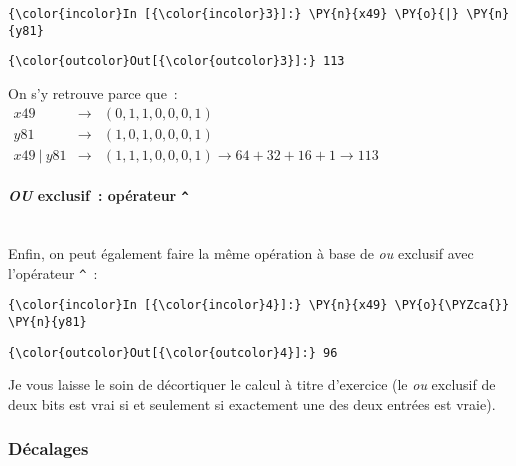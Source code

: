     \begin{Verbatim}[commandchars=\\\{\}]
{\color{incolor}In [{\color{incolor}3}]:} \PY{n}{x49} \PY{o}{|} \PY{n}{y81}
\end{Verbatim}


\begin{Verbatim}[commandchars=\\\{\}]
{\color{outcolor}Out[{\color{outcolor}3}]:} 113
\end{Verbatim}
            
    On s'y retrouve parce que~:\\

\(\begin{array}{rcl} x49 & \rightarrow & (0,1,1,0,0,0,1) \\ y81 & \rightarrow & (1,0,1,0,0,0,1) \\ x49\ |\ y81 & \rightarrow & (1,1,1,0,0,0,1) \rightarrow 64 + 32 + 16 + 1 \rightarrow 113 \end{array}\)

    \hypertarget{ou-exclusif-opuxe9rateur}{%
\paragraph{\texorpdfstring{\emph{OU} exclusif~: opérateur
\texttt{\^{}}}{OU exclusif~: opérateur \^{}}\\\\}\label{ou-exclusif-opuxe9rateur}}

    Enfin, on peut également faire la même opération à base de \emph{ou}
exclusif avec l'opérateur \texttt{\^{}}~:

    \begin{Verbatim}[commandchars=\\\{\}]
{\color{incolor}In [{\color{incolor}4}]:} \PY{n}{x49} \PY{o}{\PYZca{}} \PY{n}{y81}
\end{Verbatim}


\begin{Verbatim}[commandchars=\\\{\}]
{\color{outcolor}Out[{\color{outcolor}4}]:} 96
\end{Verbatim}
            
    Je vous laisse le soin de décortiquer le calcul à titre d'exercice (le
\emph{ou} exclusif de deux bits est vrai si et seulement si exactement
une des deux entrées est vraie).

    \hypertarget{duxe9calages}{%
\subsubsection{Décalages}\label{duxe9calages}}

